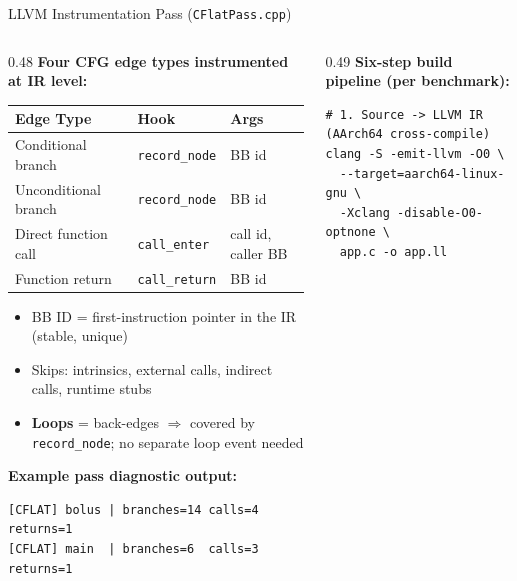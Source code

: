 \documentclass[aspectratio=169]{beamer}
\begin{document}
\begin{frame}[fragile]{LLVM Instrumentation Pass (\texttt{CFlatPass.cpp})}
\begin{columns}[T]

\begin{column}{0.48\textwidth}
  \textbf{Four CFG edge types instrumented at IR level:}

  \medskip
  \begin{tabular}{@{}lll@{}}
    \toprule
    \textbf{Edge Type}    & \textbf{Hook}           & \textbf{Args}         \\
    \midrule
    Conditional branch    & \texttt{record\_node}   & BB id                 \\
    Unconditional branch  & \texttt{record\_node}   & BB id                 \\
    Direct function call  & \texttt{call\_enter}    & call id, caller BB    \\
    Function return       & \texttt{call\_return}   & BB id                 \\
    \bottomrule
  \end{tabular}

  \medskip
  \begin{itemize}
    \item BB ID = first-instruction pointer in the IR (stable, unique)
    \item Skips: intrinsics, external calls, indirect calls, runtime stubs
    \item \textbf{Loops} = back-edges $\Rightarrow$ covered by \texttt{record\_node};
          no separate loop event needed
  \end{itemize}

  \medskip
  \textbf{Example pass diagnostic output:}
  \begin{lstlisting}[style=logstyle]
[CFLAT] bolus | branches=14 calls=4 returns=1
[CFLAT] main  | branches=6  calls=3 returns=1
  \end{lstlisting}
\end{column}

\begin{column}{0.49\textwidth}
  \textbf{Six-step build pipeline (per benchmark):}

  \begin{lstlisting}[style=bashstyle]
# 1. Source -> LLVM IR (AArch64 cross-compile)
clang -S -emit-llvm -O0 \
  --target=aarch64-linux-gnu \
  -Xclang -disable-O0-optnone \
  app.c -o app.ll


\end{lstlisting}
\end{column}
\end{columns}
\end{frame}
\end{document}
